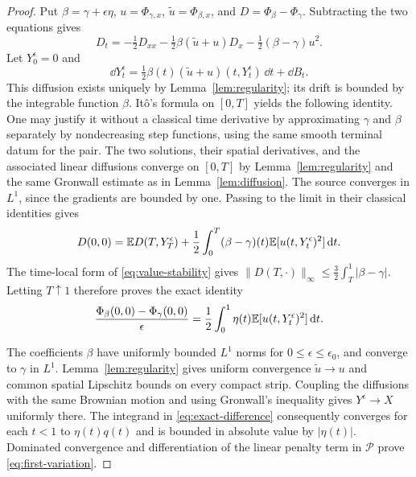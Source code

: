 \begin{proof}
Put $\beta=\gamma+\epsilon\eta$, $u=\Phi_{\gamma,x}$,
$\widetilde u=\Phi_{\beta,x}$, and
$D=\Phi_\beta-\Phi_\gamma$.  Subtracting the two equations gives
\[
 D_t=-\tfrac12D_{xx}
       -\tfrac12\beta(\widetilde u+u)D_x
       -\tfrac12(\beta-\gamma)u^2.
\]
Let $Y^\epsilon_0=0$ and
\[
 \dd Y^\epsilon_t
   =\tfrac12\beta(t)(\widetilde u+u)(t,Y^\epsilon_t)\,\dd t
      +\dd B_t.
\]
This diffusion exists uniquely by Lemma~\ref{lem:regularity};
its drift is bounded by the integrable function $\beta$.
It\^o's formula on $[0,T]$ yields the following identity.  One
may justify it without a classical time derivative by approximating
$\gamma$ and $\beta$ separately by nondecreasing step functions,
using the same smooth terminal datum for the pair.  The two
solutions, their spatial derivatives, and the associated linear
diffusions converge on $[0,T]$ by Lemma~\ref{lem:regularity} and
the same Gronwall estimate as in Lemma~\ref{lem:diffusion}.
The source converges in $L^1$, since the gradients are bounded
by one.  Passing to the limit in their classical identities gives
\[
 D(0,0)=\mathbb E D(T,Y^\epsilon_T)
       +\frac12\int_0^T(\beta-\gamma)(t)
                       \mathbb E[u(t,Y^\epsilon_t)^2]\,\mathrm d t.
\]
The time-local form of \eqref{eq:value-stability} gives
$\|D(T,\cdot)\|_\infty
 \leq\frac32\int_T^1|\beta-\gamma|$.
Letting $T\uparrow1$ therefore proves the exact identity
\begin{equation}
 \frac{\Phi_\beta(0,0)-\Phi_\gamma(0,0)}\epsilon
    =\frac12\int_0^1\eta(t)
                     \mathbb E[u(t,Y^\epsilon_t)^2]\,\mathrm d t.
 \label{eq:exact-difference}
\end{equation}

The coefficients $\beta$ have uniformly bounded $L^1$ norms for
$0\leq\epsilon\leq\epsilon_0$, and converge to $\gamma$ in
$L^1$.  Lemma~\ref{lem:regularity} gives uniform convergence
$\widetilde u\to u$ and common spatial Lipschitz bounds on every
compact strip.  Coupling the diffusions with the same Brownian
motion and using Gronwall's inequality gives
$Y^\epsilon\to X$ uniformly there.  The integrand in
\eqref{eq:exact-difference} consequently converges for each $t<1$
to $\eta(t)q(t)$ and is bounded in absolute value by $|\eta(t)|$.
Dominated convergence and differentiation of the linear penalty
term in $\mathcal P$ prove \eqref{eq:first-variation}.
\end{proof}

